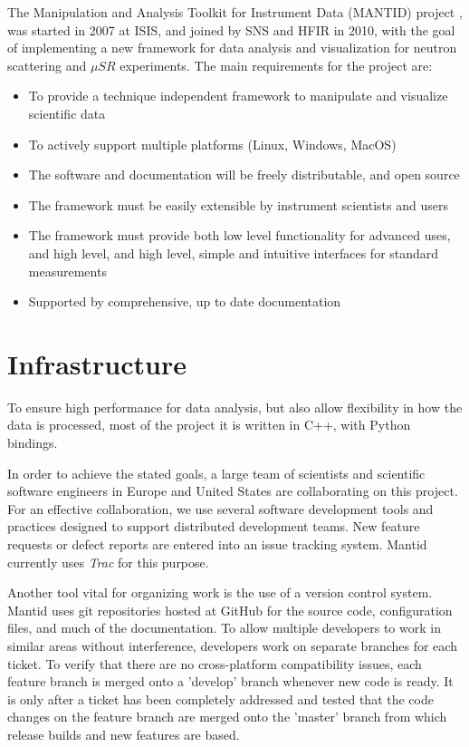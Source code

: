 \documentclass{elsarticle}
\begin{document}
The Manipulation and Analysis Toolkit for Instrument Data (MANTID) project \cite{TaylorMantid}, was started in 2007 at ISIS, and joined by SNS and HFIR in 2010, with the goal of implementing a new framework for data analysis and visualization for neutron scattering and $\mu SR$ experiments. The main requirements for the project are:
\begin{itemize}
\item To provide a technique independent framework to manipulate and visualize scientific data 
\item To actively support multiple platforms (Linux, Windows, MacOS)
\item The software and documentation will be freely distributable, and open source
\item The framework must be easily extensible by instrument scientists and users
\item The framework must provide both low level functionality for advanced uses, and high level, and high level, simple and intuitive interfaces for standard measurements 
\item Supported by comprehensive, up to date documentation
\end{itemize}
 


\section{Infrastructure}
\label{infrastructure}
To ensure high performance for data analysis, but also allow flexibility in how the data is processed, most of the project it is written in C++, with Python bindings.
 
In order to achieve the stated goals, a large team of scientists and scientific software engineers in Europe and United States are collaborating on this project. For an effective collaboration, we use several software development tools and practices designed to support distributed development teams. New feature requests or defect reports are entered into an issue tracking system. Mantid currently uses  \textit{Trac} \cite{trac} for this purpose.
 
Another tool vital for organizing work is the use of a version control system. Mantid uses git \cite{git} repositories hosted at GitHub \cite{github} for the source code, configuration files, and much of the documentation. To allow multiple developers to work in similar areas without interference, developers work on separate branches for each ticket. To verify that there are no cross-platform compatibility issues, each feature branch is merged onto a 'develop' branch whenever new code is ready. It is only after a ticket has been completely addressed and tested that the code changes on the feature branch are merged onto the 'master' branch from which release builds and new features are based.
\end{document}
